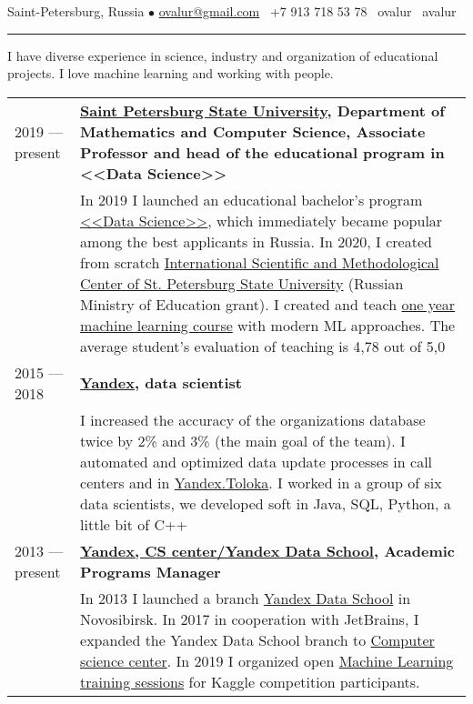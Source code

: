 \documentclass[11pt]{article}
\begin{document}
%

\vspace{0.5em}

\noindent Saint-Petersburg, Russia $\bullet$ \href{mailto:ovalur@gmail.com}{ovalur@gmail.com} \faMobile~+7 913 718 53 78 \faSendO~ovalur
\faGithub~avalur

\vspace{0.5em}
\hrule
\vspace{0.5em}

I have diverse experience in science, industry and organization of educational projects. I love machine learning and working with people.

\vspace{0.5em}
\begin{longtable} {l | p{}}

2019 — present & {\textbf{\href{https://spbu.ru}{Saint Petersburg State University}, Department of Mathematics and Computer Science, Associate Professor and head of the educational program in <<Data Science>>}} \\

& {In 2019 I launched an educational bachelor's program \href{https://maad.compscicenter.ru}{<<Data Science>>}, which immediately became popular among the best applicants in Russia. In 2020, I created from scratch \href{https://gsom.spbu.ru/all_news/event2021-02-04/}{International Scientific and Methodological Center of St. Petersburg State University} (Russian Ministry of Education grant). I created and teach \href{https://github.com/spbu-math-cs/ml-course/}{one year machine learning course} with modern ML approaches. The average student's evaluation of teaching is 4,78 out of 5,0} \\

2015 — 2018 & {\textbf{\href{https://yandex.ru/}{Yandex}, data scientist}} \\
& {I increased the accuracy of the organizations database twice by 2\% and 3\% (the main goal of the team). I automated and optimized data update processes in call centers and in \href{https://toloka.yandex.ru}{Yandex.Toloka}. I worked in a group of six data scientists, we  developed soft in Java, SQL, Python, a little bit of C++}\\

2013 — present & {\textbf{\href{https://compscicenter.ru}{Yandex, CS center/Yandex Data School}, Academic Programs Manager}} \\
& {In 2013 I launched a branch \href{https://yandexdataschool.ru}{Yandex Data School} in Novosibirsk. In 2017 in cooperation with JetBrains, I expanded the Yandex Data School branch to \href{https://compscicenter.ru}{Computer science center}. In 2019 I organized open \href{https://habr.com/ru/company/JetBrains-education/blog/458042/}{Machine Learning training sessions} for Kaggle competition participants.} \\


\end{longtable}
\end{document}
